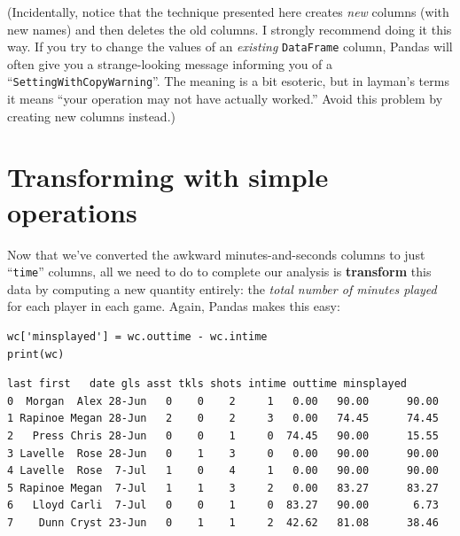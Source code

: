\medskip

{\small
{}
(Incidentally, notice that the technique presented here creates \textit{new}
columns (with new names) and then deletes the old columns. I strongly recommend
doing it this way. If you try to change the values of an \textit{existing}
\texttt{DataFrame} column, Pandas will often give you a strange-looking message
informing you of a ``\texttt{SettingWithCopyWarning}''. The meaning is a bit
esoteric, but in layman's terms it means ``your operation may not have actually
worked.'' Avoid this problem by creating new columns instead.)}

\section{Transforming with simple operations}



Now that we've converted the awkward minutes-and-seconds columns to just
``\texttt{time}'' columns, all we need to do to complete our analysis is
\textbf{transform} this data by computing a new quantity entirely: the
\textit{total number of minutes played} for each player in each game. Again,
Pandas makes this easy:

\begin{Verbatim}[fontsize=\footnotesize,samepage=true,frame=single,framesep=3mm]
wc['minsplayed'] = wc.outtime - wc.intime
print(wc)
\end{Verbatim}
\vspace{-.2in}

\begin{Verbatim}[fontsize=\CBCodeSmall,samepage=true,frame=leftline,framesep=5mm,framerule=1mm]
     last first   date gls asst tkls shots intime outtime minsplayed
0  Morgan  Alex 28-Jun   0    0    2     1   0.00   90.00      90.00
1 Rapinoe Megan 28-Jun   2    0    2     3   0.00   74.45      74.45
2   Press Chris 28-Jun   0    0    1     0  74.45   90.00      15.55
3 Lavelle  Rose 28-Jun   0    1    3     0   0.00   90.00      90.00
4 Lavelle  Rose  7-Jul   1    0    4     1   0.00   90.00      90.00
5 Rapinoe Megan  7-Jul   1    1    3     2   0.00   83.27      83.27
6   Lloyd Carli  7-Jul   0    0    1     0  83.27   90.00       6.73
7    Dunn Cryst 23-Jun   0    1    1     2  42.62   81.08      38.46
\end{Verbatim}

